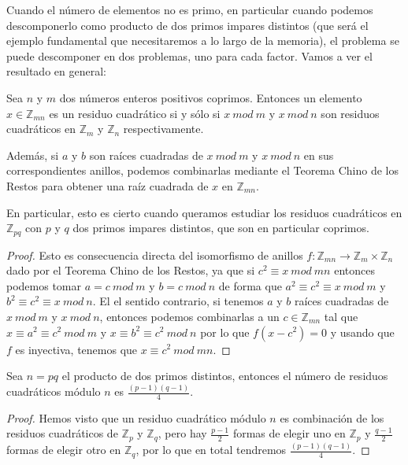Cuando el n\'umero de elementos no es primo, en particular cuando podemos descomponerlo como producto de dos primos impares distintos (que ser\'a el ejemplo fundamental que
necesitaremos a lo largo de la memoria), el problema se puede descomponer en dos problemas, uno para cada factor. Vamos a ver el resultado en general:

\begin{proposition}
\label{numResCuadpq:prop}
Sea $n$ y $m$ dos n\'umeros enteros positivos coprimos. Entonces un elemento
$x \in {\mathbb Z}_{mn}$ es un residuo cuadr\'atico si y s\'olo si $x~mod~m$
y $x~mod~n$ son residuos cuadr\'aticos en ${\mathbb Z}_m$ y ${\mathbb Z}_n$
respectivamente.

Adem\'as, si $a$ y $b$ son ra\'ices cuadradas de $x~mod~m$ y $x~mod~n$ en sus
correspondientes anillos, podemos combinarlas mediante el Teorema Chino de los Restos
para obtener una ra\'iz cuadrada de $x$ en ${\mathbb Z}_{mn}$.

En particular, esto es cierto cuando queramos estudiar los residuos cuadr\'aticos en
${\mathbb Z}_{pq}$ con $p$ y $q$ dos primos impares distintos, que son en particular coprimos.
\end{proposition}
\begin{proof}
Esto es consecuencia directa del isomorfismo de anillos $f:{\mathbb Z}_{mn} \to {\mathbb Z}_m \times {\mathbb Z}_n$ dado por el Teorema Chino de los Restos, ya que si
$c^2 \equiv x ~mod~mn$ entonces podemos tomar $a = c~mod~m$ y $b = c~mod~n$ de forma que $a^2 \equiv c^2 \equiv x ~mod~m$ y $b^2 \equiv c^2 \equiv x~mod~n$. El
el sentido contrario, si tenemos $a$ y $b$ ra\'ices cuadradas de $x~mod~m$ y $x~mod~n$, entonces podemos combinarlas a un $c \in {\mathbb Z}_{mn}$ tal que
$x \equiv a^2 \equiv c^2~mod~m$ y $x \equiv b^2 \equiv c^2 ~mod~n$ por lo que $f(x-c^2) = 0$ y usando que $f$ es inyectiva, tenemos que $x \equiv c^2 ~mod~mn$.
\end{proof}

\begin{corollary}\label{corNumResCuad}
Sea $n = pq$ el producto de dos primos distintos, entonces el n\'umero de residuos cuadr\'aticos m\'odulo $n$ es $\frac{(p-1)(q-1)}{4}$.
\end{corollary}
\begin{proof}
Hemos visto que un residuo cuadr\'atico m\'odulo $n$ es combinaci\'on de los residuos cuadr\'aticos de ${\mathbb Z}_p$ y ${\mathbb Z}_q$, pero hay $\frac{p-1}{2}$ formas
de elegir uno en ${\mathbb Z}_p$ y $\frac{q-1}{2}$ formas de elegir otro en ${\mathbb Z}_q$, por lo que en total tendremos $\frac{(p-1)(q-1)}{4}$.
\end{proof}

